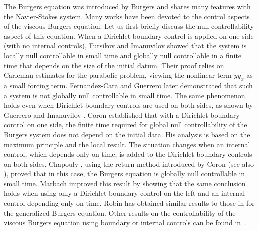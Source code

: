 \documentclass[11pt, reqno]{amsart}
\theoremstyle{plain}
\numberwithin{equation}{section}
\begin{document}
The Burgers equation was introduced by Burgers \cite{Burgers} and shares many features with the Navier-Stokes system. Many works have been devoted to the control aspects of the viscous Burgers equation. Let us first briefly discuss the null controllability aspect of this equation. When a Dirichlet boundary control is applied on one side (with no internal controls), Fursikov and Imanuvilov \cite{Fursikov-Imanuvilov} showed that the system is locally null controllable in small time and globally null controllable in a finite time that depends on the size of the initial datum. Their proof relies on Carleman estimates for the parabolic problem, viewing the nonlinear term $y y_x$ as a small forcing term. Fernandez-Cara and Guerrero \cite{CG-07} later demonstrated that such a system is not globally null controllable in small time. The same phenomenon holds even when Dirichlet boundary controls are used on both sides, as shown by Guerrero and Imanuvilov \cite{Guerrero-Imanuvilov}. Coron \cite{Coron-07} established that with a Dirichlet boundary control on one side, the finite time required for global null controllability of the Burgers system does not depend on the initial data. His analysis is based on the maximum principle and the local result. The situation changes when an internal control, which depends only on time, is added to the Dirichlet boundary controls on both sides. Chapouly \cite{Chapouly}, using the return method introduced by Coron \cite{Coron-93, Coron-96} (see also \cite[Chapter 6]{Coron-07-book}), proved that in this case, the Burgers equation is globally null controllable in small time. Marbach \cite{Marbach14} improved this result by showing that the same conclusion holds when using only a Dirichlet boundary control on the left and an internal control depending only on time. Robin \cite{Robin} has obtained similar results to those in \cite{Marbach14} for the generalized Burgers equation. Other results on the controllability of the viscous Burgers equation using boundary or internal controls can be found in \cite{FI-95, Diaz-96, CG-05, GS-07}. 
\end{document}
